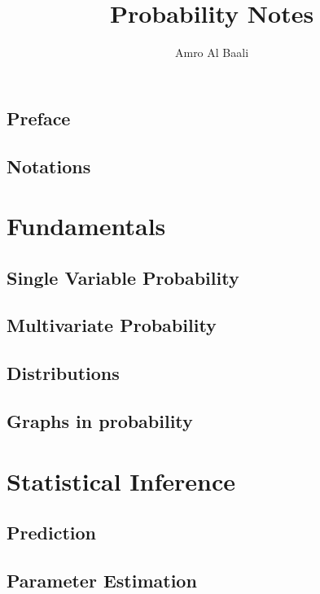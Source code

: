 \documentclass{amro-notes}
\title{Probability Notes}
\author{Amro Al Baali}
\date{\daterange}
\begin{document}
\maketitle
\tableofcontents
{} 


\chapter*{Preface}


\clearpage
\chapter*{Notations}


\clearpage
{} 
\part{Fundamentals}
\label{part:fundamentals}

\chapter{Single Variable Probability}


\clearpage
\chapter{Multivariate Probability}


\clearpage
\chapter{Distributions}


\clearpage
\chapter{Graphs in probability}


\clearpage
\part{Statistical Inference}

\chapter{Prediction}


\chapter{Parameter Estimation}



\begin{appendices}
    
\end{appendices}


\end{document}
